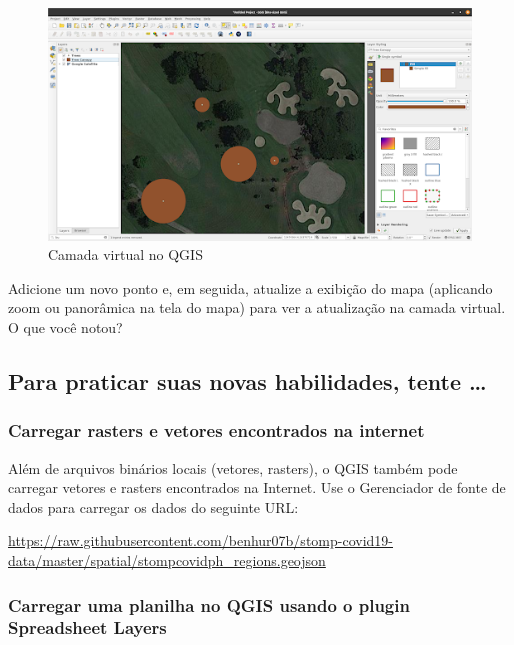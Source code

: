 \documentclass[
]{book}
\begin{document}
\begin{figure}
\centering
\includegraphics{media/modulo2/virtual-6.png}
\caption{Camada virtual no QGIS}
\end{figure}

Adicione um novo ponto e, em seguida, atualize a exibição do mapa (aplicando zoom ou panorâmica na tela do mapa) para ver a atualização na camada virtual. O que você notou?

\hypertarget{para-praticar-suas-novas-habilidades-tente-2}{%
\subsection{Para praticar suas novas habilidades, tente \ldots{}}\label{para-praticar-suas-novas-habilidades-tente-2}}

\hypertarget{carregar-rasters-e-vetores-encontrados-na-internet}{%
\subsubsection{\texorpdfstring{\textbf{Carregar rasters e vetores encontrados na internet}}{Carregar rasters e vetores encontrados na internet}}\label{carregar-rasters-e-vetores-encontrados-na-internet}}

Além de arquivos binários locais (vetores, rasters), o QGIS também pode carregar vetores e rasters encontrados na Internet. Use o Gerenciador de fonte de dados para carregar os dados do seguinte URL:

\url{https://raw.githubusercontent.com/benhur07b/stomp-covid19-data/master/spatial/stompcovidph_regions.geojson}

\hypertarget{carregar-uma-planilha-no-qgis-usando-o-plugin-spreadsheet-layers}{%
\subsubsection{\texorpdfstring{\textbf{Carregar uma planilha no QGIS usando o plugin Spreadsheet Layers}}{Carregar uma planilha no QGIS usando o plugin Spreadsheet Layers}}\label{carregar-uma-planilha-no-qgis-usando-o-plugin-spreadsheet-layers}}
\end{document}
